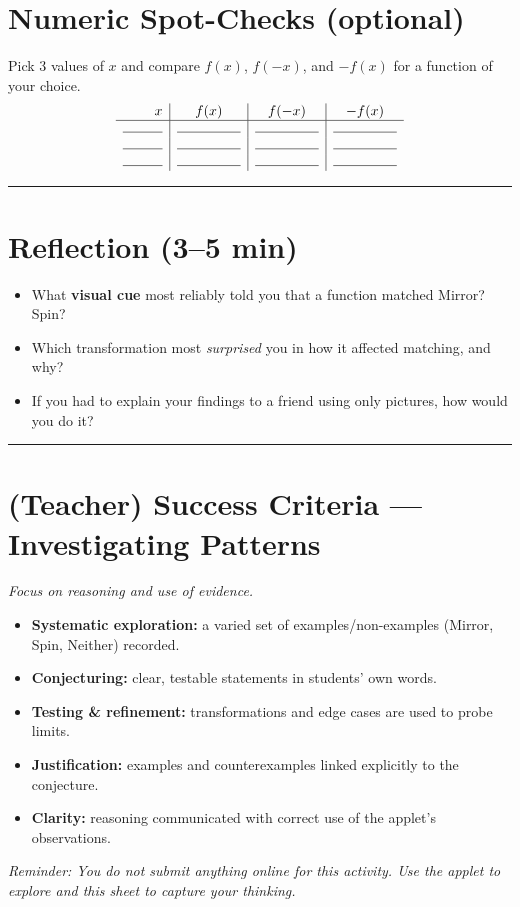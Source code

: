 \documentclass[11pt]{article}
\newcommand{\ruleline}{\par\noindent\rule{\textwidth}{0.4pt}\par}
\newcommand{\blank}[1]{\makebox[#1]{\hrulefill}}
\begin{document}
\section*{Numeric Spot-Checks (optional)}
Pick 3 values of \(x\) and compare \(f(x)\), \(f(-x)\), and \(-f(x)\) for a function of your choice.
\[
\begin{array}{r|c|c|c}
x & f(x) & f(-x) & -f(x)\\\hline
\blank{1cm} & \blank{1.6cm} & \blank{1.6cm} & \blank{1.6cm}\\
\blank{1cm} & \blank{1.6cm} & \blank{1.6cm} & \blank{1.6cm}\\
\blank{1cm} & \blank{1.6cm} & \blank{1.6cm} & \blank{1.6cm}\\
\end{array}
\]

\ruleline

\section*{Reflection (3--5 min)}
\begin{itemize}
  \item What \textbf{visual cue} most reliably told you that a function matched Mirror? Spin?
  \item Which transformation most \emph{surprised} you in how it affected matching, and why?
  \item If you had to explain your findings to a friend using only pictures, how would you do it?
\end{itemize}
\vspace{1.5em}\ruleline

\section*{(Teacher) Success Criteria — Investigating Patterns}
\textit{Focus on reasoning and use of evidence.}
\begin{itemize}
  \item \textbf{Systematic exploration:} a varied set of examples/non-examples (Mirror, Spin, Neither) recorded.
  \item \textbf{Conjecturing:} clear, testable statements in students’ own words.
  \item \textbf{Testing \& refinement:} transformations and edge cases are used to probe limits.
  \item \textbf{Justification:} examples and counterexamples linked explicitly to the conjecture.
  \item \textbf{Clarity:} reasoning communicated with correct use of the applet’s observations.
\end{itemize}

\vfill
\begin{center}
\textit{Reminder: You do not submit anything online for this activity. Use the applet to explore and this sheet to capture your thinking.}
\end{center}
\end{document}
